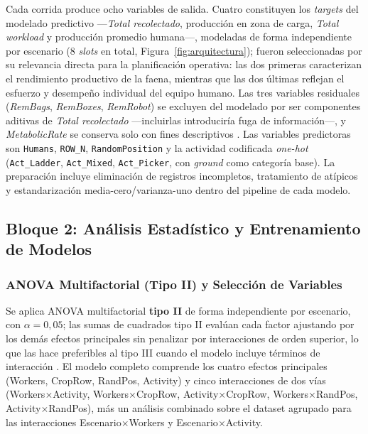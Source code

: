 \documentclass[conference]{IEEEtran}
\begin{document}
Cada corrida produce ocho variables de salida. Cuatro constituyen los \textit{targets} del modelado predictivo —\textit{Total recolectado}, producción en zona de carga, \textit{Total workload} y producción promedio humana—, modeladas de forma independiente por escenario (8 \textit{slots} en total, Figura~\ref{fig:arquitectura}); fueron seleccionadas por su relevancia directa para la planificación operativa: las dos primeras caracterizan el rendimiento productivo de la faena, mientras que las dos últimas reflejan el esfuerzo y desempeño individual del equipo humano. Las tres variables residuales (\textit{RemBags}, \textit{RemBoxes}, \textit{RemRobot}) se excluyen del modelado por ser componentes aditivas de \textit{Total recolectado} —incluirlas introduciría fuga de información—, y \textit{MetabolicRate} se conserva solo con fines descriptivos \cite{garcia2026}. Las variables predictoras son \texttt{Humans}, \texttt{ROW\_N}, \texttt{RandomPosition} y la actividad codificada \textit{one-hot} (\texttt{Act\_Ladder}, \texttt{Act\_Mixed}, \texttt{Act\_Picker}, con \textit{ground} como categoría base). La preparación incluye eliminación de registros incompletos, tratamiento de atípicos y estandarización media-cero/varianza-uno dentro del pipeline de cada modelo.

\subsection{Bloque 2: Análisis Estadístico y Entrenamiento de Modelos}
\label{sec:bloque2}

\subsubsection{ANOVA Multifactorial (Tipo II) y Selección de Variables}

Se aplica ANOVA multifactorial \textbf{tipo II} de forma independiente por escenario, con $\alpha = 0{,}05$; las sumas de cuadrados tipo II evalúan cada factor ajustando por los demás efectos principales sin penalizar por interacciones de orden superior, lo que las hace preferibles al tipo III cuando el modelo incluye términos de interacción \cite{langsrud2003}. El modelo completo comprende los cuatro efectos principales (Workers, CropRow, RandPos, Activity) y cinco interacciones de dos vías (Workers$\times$Activity, Workers$\times$CropRow, Activity$\times$CropRow, Workers$\times$RandPos, Activity$\times$RandPos), más un análisis combinado sobre el dataset agrupado para las interacciones Escenario$\times$Workers y Escenario$\times$Activity.
\end{document}
